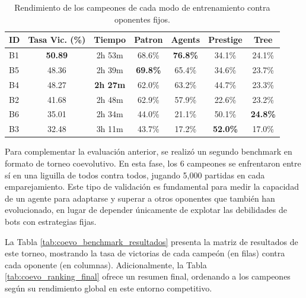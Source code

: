 \begin{table}[H]
	\centering
	\caption{Rendimiento de los campeones de cada modo de entrenamiento contra oponentes fijos.}
	\label{tab:resultados_exp_modos}
	\begin{tabular}{@{}lcccccc@{}}
		\toprule
		\textbf{ID} & \textbf{Tasa Vic. (\%)} & \textbf{Tiempo} & \textbf{Patron} & \textbf{Agents} & \textbf{Prestige} & \textbf{Tree}   \\
		\midrule
		B1          & \textbf{50.89}          & 2h 53m          & 68.6\%          & \textbf{76.8\%} & 34.1\%            & 24.1\%          \\
		B5          & 48.36                   & 2h 39m          & \textbf{69.8\%} & 65.4\%          & 34.6\%            & 23.7\%          \\
		B4          & 48.27                   & \textbf{2h 27m} & 62.0\%          & 63.2\%          & 44.7\%            & 23.3\%          \\
		B2          & 41.68                   & 2h 48m          & 62.9\%          & 57.9\%          & 22.6\%            & 23.2\%          \\
		B6          & 35.01                   & 2h 34m          & 44.0\%          & 21.1\%          & 50.1\%            & \textbf{24.8\%} \\
		B3          & 32.48                   & 3h 11m          & 43.7\%          & 17.2\%          & \textbf{52.0\%}   & 17.0\%          \\
		\bottomrule
	\end{tabular}
\end{table}

Para complementar la evaluación anterior, se realizó un segundo benchmark en formato de torneo coevolutivo. En esta fase, los 6 campeones se enfrentaron entre sí en una liguilla de todos contra todos, jugando 5,000 partidas en cada emparejamiento. Este tipo de validación es fundamental para medir la capacidad de un agente para adaptarse y superar a otros oponentes que también han evolucionado, en lugar de depender únicamente de explotar las debilidades de bots con estrategias fijas.

La Tabla \ref{tab:coevo_benchmark_resultados} presenta la matriz de resultados de este torneo, mostrando la tasa de victorias de cada campeón (en filas) contra cada oponente (en columnas). Adicionalmente, la Tabla \ref{tab:coevo_ranking_final} ofrece un resumen final, ordenando a los campeones según su rendimiento global en este entorno competitivo.

